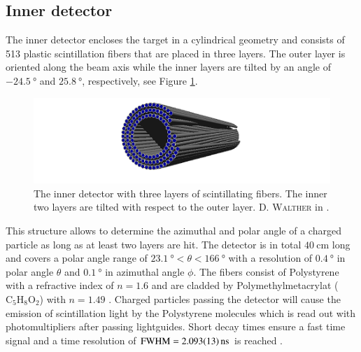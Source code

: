 \subsection{Inner detector}
\label{sec:in}
The inner detector \cite{indet,suft} encloses the target in a cylindrical geometry and consists of 513 plastic scintillation fibers that are placed in three layers. The outer layer is oriented along the beam axis while the inner layers are tilted by an angle of $\SI{-24.5}{\degree}$ and $\SI{25.8}{\degree}$, respectively, see Figure \ref{fig:indet}.
\begin{figure}[htbp]
	\centering
	\includegraphics[width=\linewidth]{figs/indet.pdf}
	\caption{The inner detector with three layers of scintillating fibers. The inner two layers are tilted with respect to the outer layer. \textsc{D. Walther} in \cite{farahphd}.}
	\label{fig:indet}
\end{figure}
This structure allows to determine the azimuthal and polar angle of a charged particle as long as at least two layers are hit. The detector is in total $\SI{40}{\centi\meter}$ long and covers a polar angle range of $\SI{23.1}{\degree}<\theta<\SI{166}{\degree}$ with a resolution of $\SI{0.4}{\degree}$ in polar angle $\theta$ and $\SI{0.1}{\degree}$ in azimuthal angle $\phi$. The fibers consist of Polystyrene with a refractive index of $n=1.6$ and are cladded by Polymethylmetacrylat ($\text{C}_5\text{H}_8\text{O}_2$) with $n=1.49$ \cite{prop}. Charged particles passing the detector will cause the emission of scintillation light by the Polystyrene molecules which is read out with photomultipliers after passing lightguides. Short decay times ensure a fast time signal and a time resolution of $\text{FWHM}=\SI{2.093\pm0.013}{\nano\s}$ is reached \cite{hartmanndipl}.
